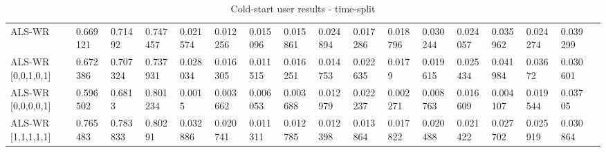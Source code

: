 \begin{table}[H]
{\begin{tabular}{*{17}{l}}
\rowcolor{Gray}
ALS-WR &	0.669121	&	0.71492	&	0.747457	&	0.021574	&	0.012256	&	0.015096	&	0.015861	&	0.024894	&	0.017286	&	0.018796	&	0.030244	&	0.024057	&	0.035962	&	0.024274	&	0.039299	&	\\															
ALS-WR [0,0,1,0,1] & 0.672386	&	0.707324	&	0.737931	&	0.028034	&	0.016305	&	0.011515	&	0.016251	&	0.014753	&	0.022635	&	0.0179	&	0.019615	&	0.025434	&	0.041984	&	0.03672	&	0.030601 & \\																												
ALS-WR [0,0,0,0,1]&	0.596502	&	0.6813	&	0.801234	&	0.0015	&	0.003662	&	0.006053	&	0.003688	&	0.012979	&	0.022237	&	0.002271	&	0.008763	&	0.016609	&	0.004107	&	0.019544	&	0.03705	& \\
ALS-WR [1,1,1,1,1] &	0.765483	&	0.783833	&	0.80291	&	0.032886	&	0.020741	&	0.011311	&	0.012785	&	0.012398	&	0.013864	&	0.017822	&	0.020488	&	0.021422	&	0.027702	&	0.025919	&	0.030864	& \\



	

\bottomrule
\end{tabular}
}
\caption{Cold-start user results -  time-split}
\end{table}

